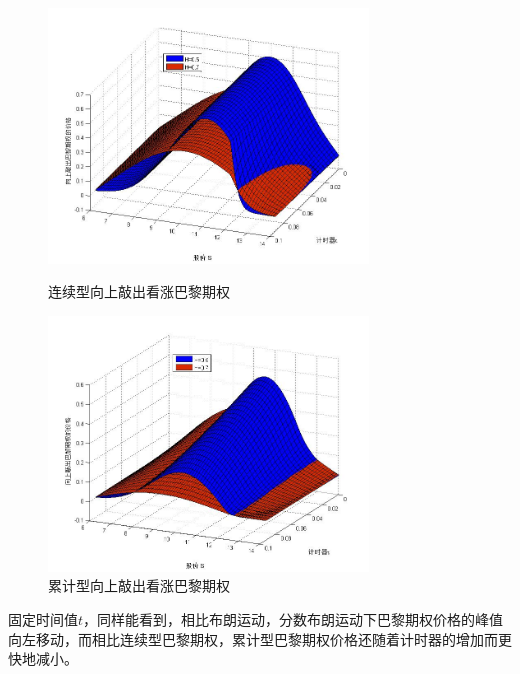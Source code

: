 \documentclass{ctexart} %
\begin{document}
\begin{figure}[H]
\begin{minipage}{0.48\linewidth}
\includegraphics[width=8.5cm]{code/paris_fbm2.jpg}
\caption{连续型向上敲出看涨巴黎期权}
\end{minipage}
\begin{minipage}{0.48\linewidth}
\includegraphics[width=8.5cm]{code/parisc_fbm2.jpg}
\caption{累计型向上敲出看涨巴黎期权}
\end{minipage}
\end{figure}
固定时间值$t$，同样能看到，相比布朗运动，分数布朗运动下巴黎期权价格的峰值向左移动，而相比连续型巴黎期权，累计型巴黎期权价格还随着计时器的增加而更快地减小。
\end{document}
